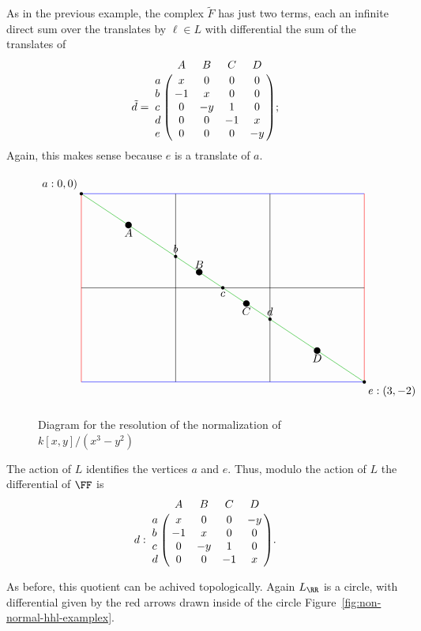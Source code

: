 \documentclass{amsart}
\begin{document}
\begin{example} 
As in the previous example, the complex $\tilde F$
has just two terms, each an infinite direct sum over the translates by $\ell \in L$
with differential the sum of the translates of
$$
\tilde d = \bordermatrix{
     &A&B&C&D\cr
    a&x&0&0&0\cr
    b&-1&x&0&0\cr
    c&0&-y&1&0\cr
    d&0&0&-1&x\cr
    e&0&0&0&-y
};
$$
\noindent Again, this makes sense because $e$ is a translate of $a$.

\begin{figure}[h]
\caption{Diagram for the resolution of the normalization of $k[x,y]/(x^3-y^2)$}
\label{fig:cuspidal cubic 1}
$$
\begin{tikzpicture}[scale=3]
  \draw (1, 0) -- (1, -2);
  \draw (2, 0) -- (2, -2);

  \draw[blue] (0,  0) -- (3,  0);
  \draw[blue] (0, -2) -- (3, -2);

  \draw[red] (0,  0) -- (0, -2);
  \draw[red] (3,  0) -- (3, -2);
  \draw (0, -1) -- (3, -1);

  \draw[green!70!black] (0,0) -- (3,-2);

  \fill (0,0)    circle (.5pt) node[above left]  {$a:0,0)$};
  \fill (1,-2/3) circle (.5pt) node[above]        {$b$};
  \fill (3/2,-1) circle (.5pt) node[below]        {$c$};
  \fill (2,-4/3) circle (.5pt) node[above]        {$d$};
  \fill (3,-2)   circle (.5pt) node[below right]  {$e:(3,-2)$};

  \fill (1/2,-1/3)   circle (1pt) node[below]  {$A$};
  \fill (5/4,-5/6)   circle (1pt) node[above]  {$B$};
  \fill (7/4,-7/6)   circle (1pt) node[below]  {$C$};
  \fill (5/2,-5/3)   circle (1pt) node[below]  {$D$};
\end{tikzpicture}
$$
\end{figure}

The action of $L$ identifies the vertices $a$ and $e$. Thus, modulo the action of $L$ the  differential
of $\FF$ is
$$d: 
\bordermatrix{
     &A&B&C&D\cr
    a&x&0&0&-y\cr
    b&-1&x&0&0\cr
    c&0&-y&1&0\cr
    d&0&0&-1&x\cr    
}.
$$

As before, this quotient can be achived topologically. Again $L_{\RR}$ is a circle, with differential
given by the red arrows drawn inside of the circle
 Figure~\ref{fig:non-normal-hhl-examplex}. 
 

\end{example}
\end{document}
